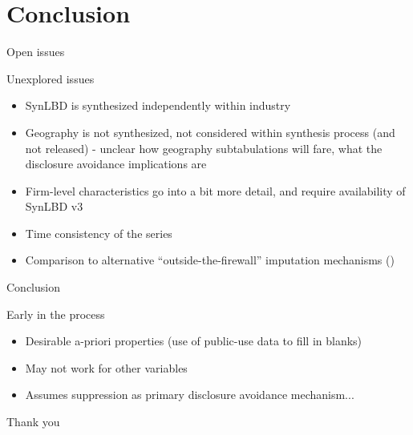 \section{Conclusion}

\begin{frame}{Open issues}
\begin{block}{Unexplored issues}
\begin{itemize}[<+->]
\item SynLBD is synthesized independently within industry
\item Geography is not synthesized, not considered within synthesis process (and not released) 
- unclear how geography subtabulations will fare, what the disclosure avoidance implications are
\item Firm-level characteristics go into a bit more detail, and require availability of SynLBD v3
\item Time consistency of the series
\item Comparison to alternative ``outside-the-firewall'' imputation mechanisms 
(\cite{HolanEtAl2010,BradleyEtAl2014})
\end{itemize}
\end{block}
\end{frame}


\begin{frame}{Conclusion}
\begin{block}{Early in the process}
\begin{itemize}
\item Desirable a-priori properties (use of public-use data to fill in blanks)
\item May not work for other variables
\item Assumes suppression as primary disclosure avoidance mechanism...
\end{itemize}\end{block}
\end{frame}

\setcounter{finalframe}{\value{framenumber}}
\setcounter{framenumber}{\value{finalframe}}


\begin{frame}
Thank you
\end{frame}


%



